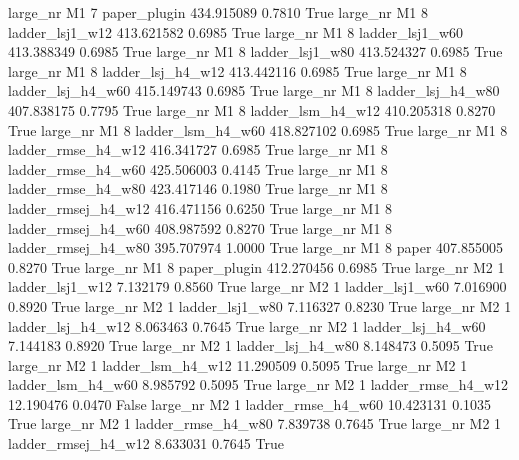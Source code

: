   large_nr       M1                 7        paper_plugin  434.915089      0.7810    True
  large_nr       M1                 8     ladder_lsj1_w12  413.621582      0.6985    True
  large_nr       M1                 8     ladder_lsj1_w60  413.388349      0.6985    True
  large_nr       M1                 8     ladder_lsj1_w80  413.524327      0.6985    True
  large_nr       M1                 8   ladder_lsj_h4_w12  413.442116      0.6985    True
  large_nr       M1                 8   ladder_lsj_h4_w60  415.149743      0.6985    True
  large_nr       M1                 8   ladder_lsj_h4_w80  407.838175      0.7795    True
  large_nr       M1                 8   ladder_lsm_h4_w12  410.205318      0.8270    True
  large_nr       M1                 8   ladder_lsm_h4_w60  418.827102      0.6985    True
  large_nr       M1                 8  ladder_rmse_h4_w12  416.341727      0.6985    True
  large_nr       M1                 8  ladder_rmse_h4_w60  425.506003      0.4145    True
  large_nr       M1                 8  ladder_rmse_h4_w80  423.417146      0.1980    True
  large_nr       M1                 8 ladder_rmsej_h4_w12  416.471156      0.6250    True
  large_nr       M1                 8 ladder_rmsej_h4_w60  408.987592      0.8270    True
  large_nr       M1                 8 ladder_rmsej_h4_w80  395.707974      1.0000    True
  large_nr       M1                 8               paper  407.855005      0.8270    True
  large_nr       M1                 8        paper_plugin  412.270456      0.6985    True
  large_nr       M2                 1     ladder_lsj1_w12    7.132179      0.8560    True
  large_nr       M2                 1     ladder_lsj1_w60    7.016900      0.8920    True
  large_nr       M2                 1     ladder_lsj1_w80    7.116327      0.8230    True
  large_nr       M2                 1   ladder_lsj_h4_w12    8.063463      0.7645    True
  large_nr       M2                 1   ladder_lsj_h4_w60    7.144183      0.8920    True
  large_nr       M2                 1   ladder_lsj_h4_w80    8.148473      0.5095    True
  large_nr       M2                 1   ladder_lsm_h4_w12   11.290509      0.5095    True
  large_nr       M2                 1   ladder_lsm_h4_w60    8.985792      0.5095    True
  large_nr       M2                 1  ladder_rmse_h4_w12   12.190476      0.0470   False
  large_nr       M2                 1  ladder_rmse_h4_w60   10.423131      0.1035    True
  large_nr       M2                 1  ladder_rmse_h4_w80    7.839738      0.7645    True
  large_nr       M2                 1 ladder_rmsej_h4_w12    8.633031      0.7645    True
